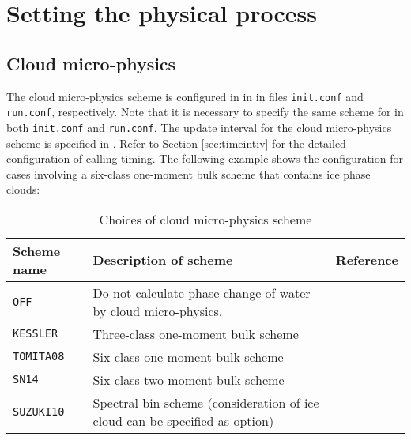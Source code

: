 \section{Setting the physical process} \label{sec:basic_usel_physics}

\subsection{Cloud micro-physics} \label{subsec:basic_usel_microphys}
The cloud micro-physics scheme is configured in  in  in files \verb|init.conf| and \verb|run.conf|, respectively. 
{\color{blue} Note that it is necessary to specify the same scheme for  in both \texttt{init.conf} and \texttt{run.conf}}. 
The update interval for the cloud micro-physics scheme is specified in . Refer to Section \ref{sec:timeintiv} for the detailed configuration of calling timing. The following example shows the configuration for cases involving a six-class one-moment bulk scheme that contains ice phase clouds:


\begin{table}[tbh]
\begin{center}
  \caption{Choices of cloud micro-physics scheme}
  \label{tab:nml_atm_mp}
  \begin{tabularx}{150mm}{lXX} \hline
    \rowcolor[gray]{0.9}  Scheme name & Description of scheme & Reference\\ \hline
     \verb|OFF|      & Do not calculate phase change of water by cloud micro-physics. &  \\
     \verb|KESSLER|  & Three-class one-moment bulk scheme & \citet{kessler_1969} \\
     \verb|TOMITA08| & Six-class one-moment bulk scheme & \citet{tomita_2008} \\
     \verb|SN14|     & Six-class two-moment bulk scheme & \citet{sn_2014} \\
     \verb|SUZUKI10| & Spectral bin scheme (consideration of ice cloud can be specified as option) & \citet{suzuki_etal_2010} \\
    \hline
  \end{tabularx}
\end{center}
\end{table}


